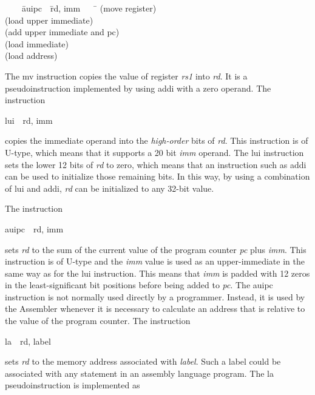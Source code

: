 \documentclass[11pt, twoside, pdftex]{article}
\newenvironment{ctabbing}%
{\begin{center}\begin{minipage}{\textwidth}\begin{tabbing}}
{\end{tabbing}\end{minipage}\end{center}}
\begin{document}
\vspace{-\baselineskip}
\begin{ctabbing}
~~~~\={\sf auipc}~~\={\sf rd, imm}~~~~\=\kill
{}  \>(move register)\\
  \>(load upper immediate)\\
  \>(add upper immediate and pc)\\
  \>(load immediate)\\
  \>(load address)\\
\end{ctabbing}
\vspace{-\baselineskip}
The {\sf mv} instruction copies the value of register {\it rs1} into {\it rd}.
It is a pseudoinstruction implemented by using {\sf addi} with a zero operand.
The instruction
\vspace{-\baselineskip}
\begin{center}
{\sf lui~~rd, imm}
\end{center}
\noindent
copies the immediate operand into the {\it high-order} bits of {\it rd}. This instruction
is of U-type, which means that it supports a 20 bit {\it imm} operand. The {\sf lui}
instruction sets the lower 12 bits of {\it rd} to zero, which means that an instruction such as
{\sf addi} can be used to initialize those remaining bits. In this way, by using a combination 
of {\sf lui} and {\sf addi}, {\it rd} can be initialized to any 32-bit value. 

The instruction
\vspace{-\baselineskip}
\begin{center}
{\sf auipc~~rd, imm}
\end{center}
\noindent
sets {\it rd} to the sum of the current value of the program counter {\it pc} plus {\it imm}. 
This instruction is of U-type and the {\it imm} value is used as an upper-immediate in the 
same way as for the {\sf lui}
instruction. This means that {\it imm} is padded with 12 zeros in the least-significant bit 
positions before being added to {\it pc}. The {\sf auipc} instruction is not normally used
directly by a programmer. Instead, it is used by the Assembler whenever it is necessary to
calculate an address that is relative to the value of the program counter.
The instruction
\vspace{-\baselineskip}
\begin{center}
{\sf la~~rd, label}
\end{center}
\vspace{-\baselineskip}
\noindent
sets {\it rd} to the memory address associated with {\it label}.  Such a label could be
associated with any statement in an assembly language program. The {\sf la} pseudoinstruction 
is implemented as
\end{document}
